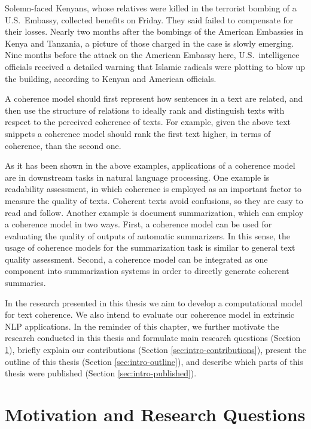 \begin{examples}
Solemn-faced Kenyans, whose relatives were killed in the terrorist bombing of a U.S.\ Embassy, collected benefits on Friday. 
They said failed to compensate for their losses. 
Nearly two months after the bombings of the American Embassies in Kenya and Tanzania, a picture of those charged in the case is slowly emerging. 
Nine months before the attack on the American Embassy here, U.S.\ intelligence officials received a detailed warning that Islamic radicals were plotting to blow up the building, according to Kenyan and American officials. 
\end{examples}

A coherence model should first represent how sentences in a text are related, and then use the structure of relations to ideally rank and distinguish texts with respect to the perceived coherence of texts. 
For example, given the above text snippets a coherence model should rank the first text higher, in terms of coherence, than the second one. 

As it has been shown in the above examples, applications of a coherence model are in downstream tasks in natural language processing. 
One example is readability assessment, in which coherence is employed as an important factor to measure the quality of texts. 
Coherent texts avoid confusions, so they are easy to read and follow. 
Another example is document summarization, which can employ a coherence model in two ways. 
First, a coherence model can be used for evaluating the quality of outputs of automatic summarizers. 
In this sense, the usage of coherence models for the summarization task is similar to general text quality assessment. 
Second, a coherence model can be integrated as one component into summarization systems in order to directly generate coherent summaries. 


In the research presented in this thesis we aim to develop a computational model for text coherence. 
We also intend to evaluate our coherence model in extrinsic NLP applications. 
In the reminder of this chapter, we further motivate the research conducted in this thesis and formulate main research questions (Section \ref{sec:intro-motivation}), briefly explain our contributions (Section \ref{sec:intro-contributions}), present the outline of this thesis (Section \ref{sec:intro-outline}), and describe which parts of this thesis were published (Section \ref{sec:intro-published}). 

\section{Motivation and Research Questions}
\label{sec:intro-motivation}

